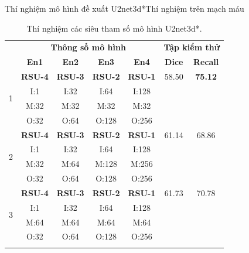 \documentclass[
	10pt,                %
	aspectratio=169,     %
]{beamer}
\begin{document}
    \begin{frame}{Thí nghiệm mô hình đề xuất U2net3d*}{Thí nghiệm trên mạch máu}
    \vspace{3mm}
	\begin{table}[H]
        \centering
        \begin{tabular}{c|c c c c|c c}
        \Xhline{3\arrayrulewidth}
            \multirow{2}{*}{\textbf{STT}} & \multicolumn{4}{c|}{\textbf{Thông số mô hình}} & \multicolumn{2}{c}{\textbf{Tập kiểm thử}} \\
            & \textbf{En1} & \textbf{En2} & \textbf{En3} & \textbf{En4} & \textbf{Dice} & \textbf{Recall} \\ 
            \hline
            \multirow{4}{*}{1} & \textbf{RSU-4} & \textbf{RSU-3} & \textbf{RSU-2} & \textbf{RSU-1} & 58.50 & \textbf{75.12}\\
                                          & I:1  & I:32 & I:64 & I:128 \\ 
                                          & M:32 & M:32 & M:32 & M:32 \\
                                          & O:32 & O:64 & O:128 & O:256 \\
            \hline
            \multirow{4}{*}{2} & \textbf{RSU-4} & \textbf{RSU-3} & \textbf{RSU-2} & \textbf{RSU-1} & 61.14 & 68.86 \\
                                          & I:1  & I:32 & I:64 & I:128 \\ 
                                          & M:32 & M:64 & M:128 & M:256 \\
                                          & O:32 & O:64 & O:128 & O:256 \\
            \hline
            \multirow{4}{*}{3} & \textbf{RSU-4} & \textbf{RSU-3} & \textbf{RSU-2} & \textbf{RSU-1} & 61.73 & 70.78 \\
                                          & I:1  & I:32 & I:64 & I:128 \\ 
                                          & M:64 & M:64 & M:64 & M:64 \\
                                          & O:32 & O:64 & O:128 & O:256 \\
        \Xhline{3\arrayrulewidth}
        \end{tabular}
        \caption{Thí nghiệm các siêu tham số mô hình U2net3d*.}
    \end{table}
	\end{frame}
	
\end{document}
